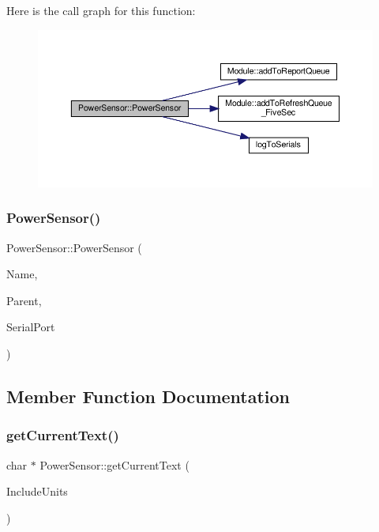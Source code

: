 Here is the call graph for this function\+:
\nopagebreak
\begin{figure}[H]
\begin{center}
\leavevmode
\includegraphics[width=350pt]{class_power_sensor_ac075e36efa8d0786590a7a2179f22520_cgraph}
\end{center}
\end{figure}
\mbox{\label{class_power_sensor_ac075e36efa8d0786590a7a2179f22520}} 
\subsubsection{\texorpdfstring{Power\+Sensor()}{PowerSensor()}\hspace{0.1cm}{\footnotesize\ttfamily [2/2]}}
{\footnotesize\ttfamily Power\+Sensor\+::\+Power\+Sensor (\begin{DoxyParamCaption}\item[{const \+\_\+\+\_\+\+Flash\+String\+Helper $\ast$}]{Name,  }\item[{\hyperlink{class_module}{Module} $\ast$}]{Parent,  }\item[{Hardware\+Serial $\ast$}]{Serial\+Port }\end{DoxyParamCaption})}



\subsection{Member Function Documentation}
\mbox{\label{class_power_sensor_ac3795cfd4910157ca6046272d53cab1f}} 
\subsubsection{\texorpdfstring{get\+Current\+Text()}{getCurrentText()}\hspace{0.1cm}{\footnotesize\ttfamily [1/2]}}
{\footnotesize\ttfamily char $\ast$ Power\+Sensor\+::get\+Current\+Text (\begin{DoxyParamCaption}\item[{bool}]{Include\+Units }\end{DoxyParamCaption})}




